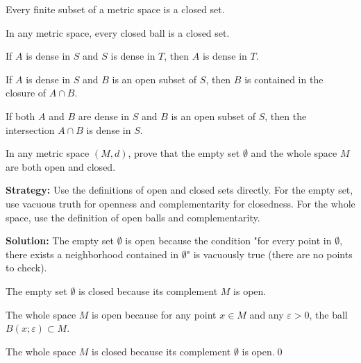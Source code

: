 \begin{theorem}
Every finite subset of a metric space is a closed set.
\end{theorem}

\begin{theorem}
In any metric space, every closed ball is a closed set.
\end{theorem}

\begin{theorem}
If $A$ is dense in $S$ and $S$ is dense in $T$, then $A$ is dense in $T$.
\end{theorem}

\begin{theorem}
If $A$ is dense in $S$ and $B$ is an open subset of $S$, then $B$ is contained in the closure of $A \cap B$.
\end{theorem}

\begin{theorem}
If both $A$ and $B$ are dense in $S$ and $B$ is an open subset of $S$, then the intersection $A \cap B$ is dense in $S$.
\end{theorem}



\begin{problembox}
In any metric space \((M, d)\), prove that the empty set \( \emptyset \) and the whole space \( M \) are both open and closed.
\end{problembox}

\noindent\textbf{Strategy:} Use the definitions of open and closed sets directly. For the empty set, use vacuous truth for openness and complementarity for closedness. For the whole space, use the definition of open balls and complementarity.

\noindent\bigskip\noindent\textbf{Solution:} The empty set $\emptyset$ is open because the condition "for every point in $\emptyset$, there exists a neighborhood contained in $\emptyset$" is vacuously true (there are no points to check).

The empty set $\emptyset$ is closed because its complement $M$ is open.

The whole space $M$ is open because for any point $x \in M$ and any $\varepsilon > 0$, the ball $B(x;\varepsilon) \subset M$.

The whole space $M$ is closed because its complement $\emptyset$ is open.\qed


